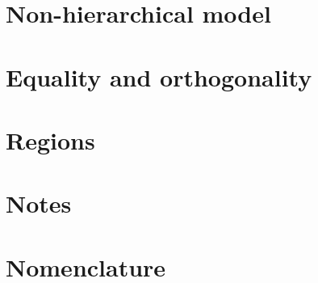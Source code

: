 \documentclass[preprint,12pt]{elsarticle}
\begin{document}
% 

% 

\section{Non-hierarchical model} \label{sec:Non_Hierarchical}


% 

\section{Equality and orthogonality} \label{sec:Eq_Orth}


\section{Regions} \label{sec:Regions}


\section{Notes} \label{sec:Notes}


\clearpage
\section{Nomenclature} \label{sec:Nomenclature}



 

\end{document}
